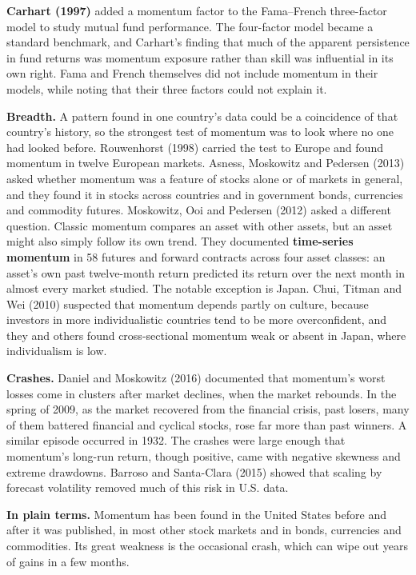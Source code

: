 \textbf{Carhart (1997)} added a momentum factor to the Fama--French three-factor model to study mutual fund performance. The four-factor model became a standard benchmark, and Carhart's finding that much of the apparent persistence in fund returns was momentum exposure rather than skill was influential in its own right. Fama and French themselves did not include momentum in their models, while noting that their three factors could not explain it.

\textbf{Breadth.} A pattern found in one country's data could be a coincidence of that country's history, so the strongest test of momentum was to look where no one had looked before. Rouwenhorst (1998) carried the test to Europe and found momentum in twelve European markets. Asness, Moskowitz and Pedersen (2013) asked whether momentum was a feature of stocks alone or of markets in general, and they found it in stocks across countries and in government bonds, currencies and commodity futures. Moskowitz, Ooi and Pedersen (2012) asked a different question. Classic momentum compares an asset with other assets, but an asset might also simply follow its own trend. They documented \textbf{time-series momentum} in 58 futures and forward contracts across four asset classes: an asset's own past twelve-month return predicted its return over the next month in almost every market studied. The notable exception is Japan. Chui, Titman and Wei (2010) suspected that momentum depends partly on culture, because investors in more individualistic countries tend to be more overconfident, and they and others found cross-sectional momentum weak or absent in Japan, where individualism is low.

\textbf{Crashes.} Daniel and Moskowitz (2016) documented that momentum's worst losses come in clusters after market declines, when the market rebounds. In the spring of 2009, as the market recovered from the financial crisis, past losers, many of them battered financial and cyclical stocks, rose far more than past winners. A similar episode occurred in 1932. The crashes were large enough that momentum's long-run return, though positive, came with negative skewness and extreme drawdowns. Barroso and Santa-Clara (2015) showed that scaling by forecast volatility removed much of this risk in U.S. data.

\noindent\textbf{In plain terms.} Momentum has been found in the United States before and after it was published, in most other stock markets and in bonds, currencies and commodities. Its great weakness is the occasional crash, which can wipe out years of gains in a few months.

